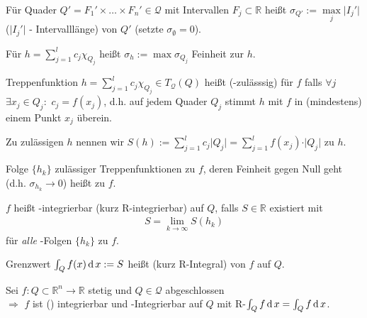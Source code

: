 \begin{*definition}
	Für Quader $Q' = F_1'\times \dotsc\times F_n'\in\mathcal{Q}$ mit Intervallen $F_j\subset\mathbb{R}$ heißt $\sigma_{Q'} := \max\limits_{j} \vert I_j'\vert$ ($\vert I_j'\vert$ - Intervalllänge)  von $Q'$ (setzte $\sigma_\emptyset = 0$).
	
	Für $h=\sum_{j=1}^l c_j \chi_{Q_j}$ heißt $\sigma_h := \max \sigma_{Q_j}$ Feinheit zur  $h$.
	
	Treppenfunktion $h=\sum_{j=1}^l c_j \chi_{Q_j}\in T_{\mathcal{Q}}(Q)$ heißt  (-zulässsig) für $f$ falls $\forall j$ $\exists x_j\in Q_j:$ $c_j = f(x_j)$, d.h. auf jedem Quader $Q_j$ stimmt $h$ mit $f$ in (mindestens) einem Punkt $x_j$ überein.
	
	Zu zulässigen $h$ nennen wir $S(h) := \sum_{j=1}^l c_j \vert Q_j\vert = \sum_{j=1}^l f(x_j) \cdot \vert Q_j\vert$  zu $h$.
	
	Folge $\{ h_k\}$ zulässiger Treppenfunktionen zu $f$, deren Feinheit gegen Null geht (d.h. $\sigma_{h_k}\to 0$) heißt  zu $f$.
	
	$f$ heißt -integrierbar (kurz R-integrierbar) auf $Q$, falls $S\in \mathbb{R}$ existiert mit \begin{align}
	S = \lim\limits_{k\to\infty} S(h_k)\end{align} für \emph{alle} -Folgen $\{ h_k \}$ zu $f$.
	
	Grenzwert $\int_Q f(x) \operatorname{d} x := S$ heißt  (kurz R-Integral) von $f$ auf $Q$.
\end{*definition}

\begin{proposition}
	Sei $f:Q\subset\mathbb{R}^n\to\mathbb{R}$ stetig und $Q\in\mathcal{Q}$ abgeschlossen \\
	$\Rightarrow$ $f$ ist (\lebesque) integrierbar und -Integrierbar auf $Q$ mit R-$\int_Q f \operatorname{d} x = \int_Q f \operatorname{d} x$.
\end{proposition}

